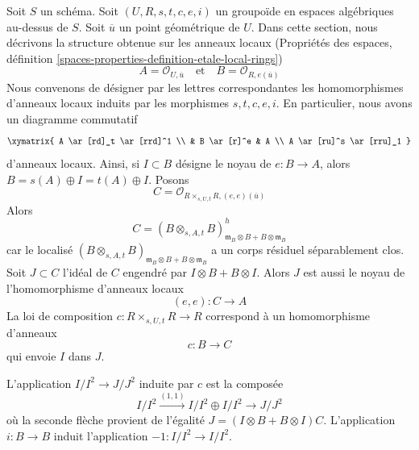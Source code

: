 \noindent
Soit $S$ un schéma.
Soit $(U, R, s, t, c, e, i)$ un groupoïde en espaces algébriques au-dessus de $S$.
Soit $\overline{u}$ un point géométrique de $U$. Dans cette section, nous
décrivons la structure obtenue sur les anneaux locaux
(Propriétés des espaces, définition
\ref{spaces-properties-definition-etale-local-rings})
$$
A = \mathcal{O}_{U, \overline{u}}
\quad\text{et}\quad
B = \mathcal{O}_{R, e(\overline{u})}
$$
Nous convenons de désigner par les lettres correspondantes les homomorphismes
d'anneaux locaux induits par les morphismes $s, t, c, e, i$.
En particulier, nous avons un diagramme commutatif
$$
\xymatrix{
A \ar[rd]_t \ar[rrd]^1 \\
& B \ar[r]^e & A \\
A \ar[ru]^s \ar[rru]_1
}
$$
d'anneaux locaux. Ainsi, si $I \subset B$ désigne le noyau de $e : B \to A$,
alors $B = s(A) \oplus I = t(A) \oplus I$. Posons
$$
C = \mathcal{O}_{R \times_{s, U, t} R, (e, e)(\overline{u})}
$$
Alors
$$
C =
(B \otimes_{s, A, t} B)_{\mathfrak m_B \otimes B + B \otimes \mathfrak m_B}^h
$$
car le localisé
$(B \otimes_{s, A, t} B)_{\mathfrak m_B \otimes B + B \otimes \mathfrak m_B}$
a un corps résiduel séparablement clos.
Soit $J \subset C$ l'idéal de $C$ engendré par $I \otimes B + B \otimes I$.
Alors $J$ est aussi le noyau de l'homomorphisme d'anneaux locaux
$$
(e, e) : C \longrightarrow A
$$
La loi de composition $c : R \times_{s, U, t} R \to R$ correspond à un
homomorphisme d'anneaux
$$
c : B \longrightarrow C
$$
qui envoie $I$ dans $J$.

\begin{lemma}
\label{lemma-first-order-structure-c}
L'application $I/I^2 \to J/J^2$ induite par $c$ est la composée
$$
I/I^2 \xrightarrow{(1, 1)} I/I^2 \oplus I/I^2 \to J/J^2
$$
où la seconde flèche provient de l'égalité
$J = (I \otimes B + B \otimes I)C$.
L'application $i : B \to B$ induit l'application $-1 : I/I^2 \to I/I^2$.
\end{lemma}

